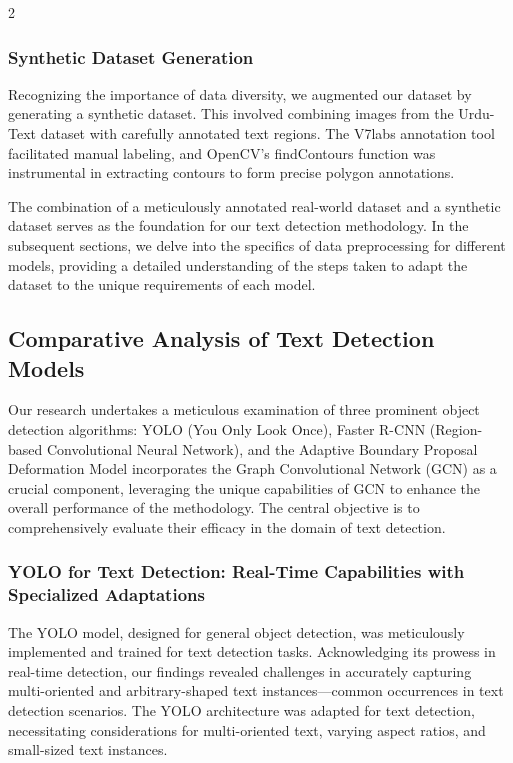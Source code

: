 \documentclass[sn-mathphys,Numbered]{sn-jnl}%
\begin{document}
\begin{multicols}{2}
\subsubsection{Synthetic Dataset Generation}
Recognizing the importance of data diversity, we augmented our dataset by generating a synthetic dataset. This involved combining images from the Urdu-Text dataset with carefully annotated text regions. The V7labs annotation tool facilitated manual labeling, and OpenCV's findContours function was instrumental in extracting contours to form precise polygon annotations.

The combination of a meticulously annotated real-world dataset and a synthetic dataset serves as the foundation for our text detection methodology. In the subsequent sections, we delve into the specifics of data preprocessing for different models, providing a detailed understanding of the steps taken to adapt the dataset to the unique requirements of each model.

\subsection{Comparative Analysis of Text Detection Models}

Our research undertakes a meticulous examination of three prominent object detection algorithms: YOLO (You Only Look Once), Faster R-CNN (Region-based Convolutional Neural Network), and the Adaptive Boundary Proposal Deformation Model incorporates the Graph Convolutional Network (GCN) as a crucial component, leveraging the unique capabilities of GCN to enhance the overall performance of the methodology. The central objective is to comprehensively evaluate their efficacy in the domain of text detection.

\subsubsection{YOLO for Text Detection: Real-Time Capabilities with Specialized Adaptations}

The YOLO model, designed for general object detection, was meticulously implemented and trained for text detection tasks. Acknowledging its prowess in real-time detection, our findings revealed challenges in accurately capturing multi-oriented and arbitrary-shaped text instances—common occurrences in text detection scenarios. The YOLO architecture was adapted for text detection, necessitating considerations for multi-oriented text, varying aspect ratios, and small-sized text instances.


\end{multicols}
\end{document}
